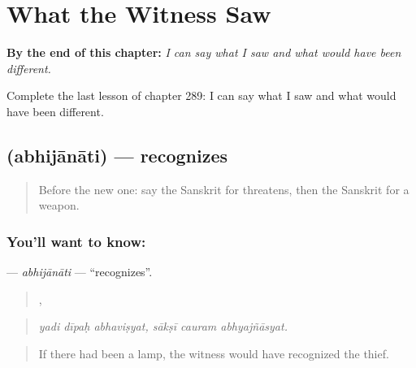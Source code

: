 
\chapter{What the Witness Saw}
\label{ch:sa-what-the-witness-saw}

\begin{chapteropening}
\textbf{By the end of this chapter:} \emph{I can say what I saw and what would have been different.}

Complete the last lesson of chapter 289: I can say what I saw and what would have been different.
\end{chapteropening}

\section[\texorpdfstring{\sk{अभिजानाति} (abhijānāti)}{अभिजानाति (abhijānāti)}]{ (abhijānāti) — recognizes}

\label{lesson:SA-C289-abhijanati}



\begin{quote}
Before the new one: say the Sanskrit for threatens, then the Sanskrit for a weapon.
\end{quote}

\subsection*{You'll want to know: }
\textbf{} — \emph{abhijānāti} — \textquotedblleft{}recognizes\textquotedblright{}.

\begin{quote}
  ,   
\end{quote}

\begin{quote}
\emph{yadi dīpaḥ abhaviṣyat, sākṣī cauram abhyajñāsyat.}
\end{quote}

\begin{quote}
If there had been a lamp, the witness would have recognized the thief.
\end{quote}


